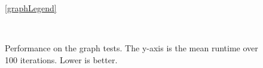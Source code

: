 \begin{figure}[t]
    \ref{graphLegend}
    \centering
    
    \\
    

    \vspace{-2em}
    \caption{Performance on the graph tests. The y-axis is the mean runtime over 100 iterations. Lower is better.}
    \label{fig::graphFigures}
    \vspace{-1em}
\end{figure}
